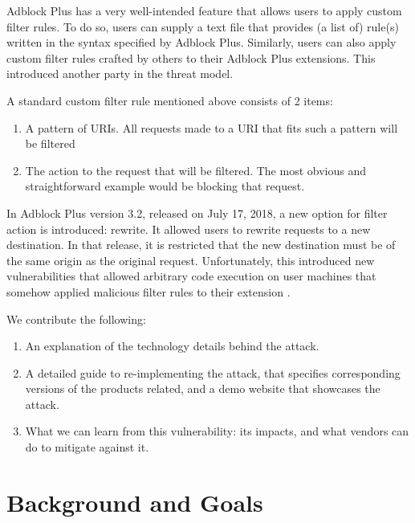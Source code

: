 \documentclass[conference]{IEEEtran}
\begin{document}
Adblock Plus has a very well-intended feature that allows users to apply custom filter rules. To do so, users can supply a text file that provides (a list of) rule(s) written in the syntax specified by Adblock Plus. Similarly, users can also apply custom filter rules crafted by others to their Adblock Plus extensions. This introduced another party in the threat model.

A standard custom filter rule mentioned above consists of 2 items:
\begin{enumerate}
    \item A pattern of URIs. All requests made to a URI that fits such a pattern will be filtered
    \item The action to the request that will be filtered. The most obvious and straightforward example would be blocking that request.
\end{enumerate}

In Adblock Plus version 3.2, released on July 17, 2018, a new option for filter action is introduced: rewrite. It allowed users to rewrite requests to a new destination. In that release, it is restricted that the new destination must be of the same origin as the original request. Unfortunately, this introduced new vulnerabilities that allowed arbitrary code execution on user machines that somehow applied malicious filter rules to their extension \cite{abp_code_injection,abp_issue_6622,abp_rewrite_pr,abp_filter_guide}.

We contribute the following:
\begin{enumerate}
    \item An explanation of the technology details behind the attack.
    \item A detailed guide to re-implementing the attack, that specifies corresponding versions of the products related, and a demo website that showcases the attack.
    \item What we can learn from this vulnerability: its impacts, and what vendors can do to mitigate against it.
\end{enumerate}

\section{Background and Goals}
\end{document}
